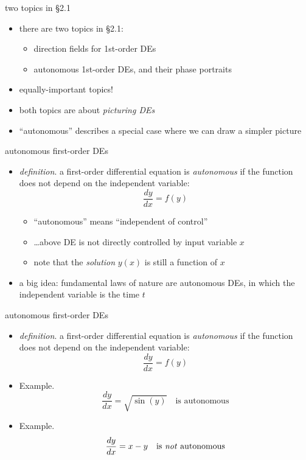 \documentclass[colorlinks]{beamer}
\begin{document}
\begin{frame}{two topics in \S 2.1}

\begin{itemize}
\item there are two topics in \S 2.1:
    \begin{itemize}
    \item \alert{direction fields} for 1st-order DEs
    \item \alert{autonomous} 1st-order DEs, and their \alert{phase portraits}
    \end{itemize}
\item equally-important topics!
\item both topics are about \emph{picturing DEs}
\item ``autonomous'' describes a special case where we can draw a simpler picture
\end{itemize}
\end{frame}


\begin{frame}{autonomous first-order DEs}

\begin{itemize}
\item \emph{definition}. a first-order differential equation is \emph{autonomous} if the function does not depend on the independent variable:
    $$\frac{dy}{dx} = f(y)$$

\medskip
    \begin{itemize}
    \item ``autonomous'' means ``independent of control''
    \item \dots above DE is not directly controlled by input variable $x$
    \item note that the \emph{solution} $y(x)$ is still a function of $x$
    \end{itemize}

\bigskip
\item a big idea: fundamental laws of nature are autonomous DEs, in which the independent variable is the time $t$
\end{itemize}
\end{frame}


\begin{frame}{autonomous first-order DEs}

\begin{itemize}
\item \emph{definition}. a first-order differential equation is \emph{autonomous} if the function does not depend on the independent variable:
    $$\frac{dy}{dx} = f(y)$$

\bigskip
\item Example.
    $$\frac{dy}{dx} = \sqrt{\sin(y)} \quad \text{is autonomous}$$
\item Example.
    $$\frac{dy}{dx} = x-y \quad \text{is \emph{not} autonomous}$$
\end{itemize}
\end{frame}
\end{document}
